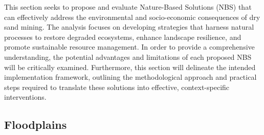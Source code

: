 


This section seeks to propose and evaluate Nature-Based Solutions (NBS) that can effectively address the environmental and socio-economic consequences of dry sand mining. The analysis focuses on developing strategies that harness natural processes to restore degraded ecosystems, enhance landscape resilience, and promote sustainable resource management. In order to provide a comprehensive understanding, the potential advantages and limitations of each proposed NBS will be critically examined. Furthermore, this section will delineate the intended implementation framework, outlining the methodological approach and practical steps required to translate these solutions into effective, context-specific interventions.

\subsection{Floodplains}

